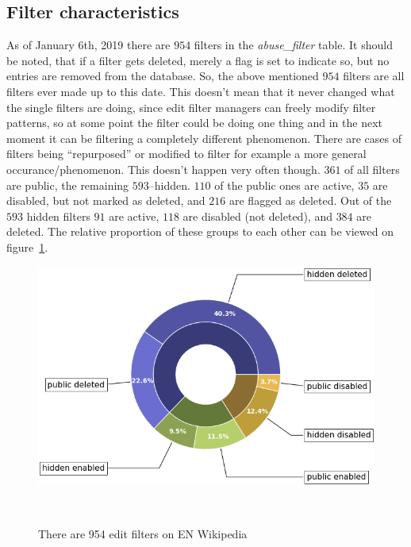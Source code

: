 \subsection{Filter characteristics}
As of January 6th, 2019 there are $954$ filters in the \emph{abuse\_filter} table.
It should be noted, that if a filter gets deleted, merely a flag is set to indicate so, but no entries are removed from the database.
So, the above mentioned $954$ filters are all filters ever made up to this date.
This doesn't mean that it never changed what the single filters are doing, since edit filter managers can freely modify filter patterns, so at some point the filter could be doing one thing and in the next moment it can be filtering a completely different phenomenon.
There are cases of filters being ``repurposed'' or modified to filter for example a more general occurance/phenomenon.
This doesn't happen very often though.
$361$ of all filters are public, the remaining $593$–hidden.
$110$ of the public ones are active, $35$ are disabled, but not marked as deleted, and $216$ are flagged as deleted.
Out of the $593$ hidden filters $91$ are active, $118$ are disabled (not deleted), and $384$ are deleted.
The relative proportion of these groups to each other can be viewed on figure~\ref{fig:general-stats}.

\begin{figure}
\centering
  \includegraphics[width=0.9\columnwidth]{pics/general-stats-donut.png}
  \caption{There are 954 edit filters on EN Wikipedia}~\label{fig:general-stats}
\end{figure}

